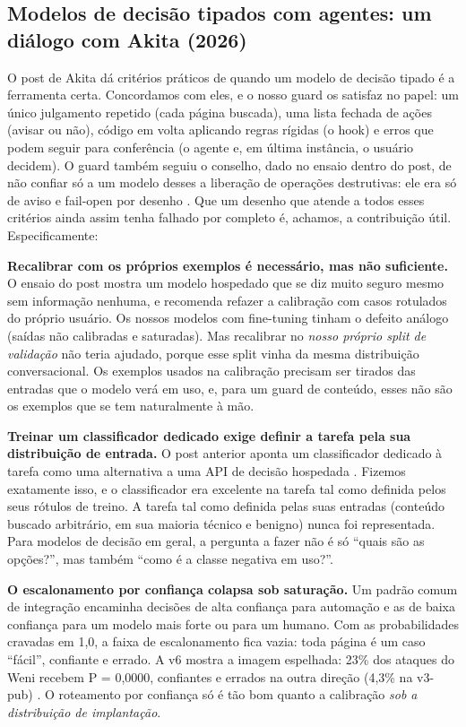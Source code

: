 \documentclass[11pt]{article}
\begin{document}
\subsection{Modelos de decisão tipados com agentes: um diálogo com Akita (2026)}\label{sec:9.2}

O post de Akita \citep{akita2026jev} dá critérios práticos de quando um modelo de decisão tipado é a ferramenta certa. Concordamos com eles, e o nosso guard os satisfaz no papel: um único julgamento repetido (cada página buscada), uma lista fechada de ações (avisar ou não), código em volta aplicando regras rígidas (o hook) e erros que podem seguir para conferência (o agente e, em última instância, o usuário decidem). O guard também seguiu o conselho, dado no ensaio dentro do post, de não confiar só a um modelo desses a liberação de operações destrutivas: ele era só de aviso e fail-open por desenho%
. Que um desenho que atende a todos esses critérios ainda assim tenha falhado por completo é, achamos, a contribuição útil. Especificamente:

\textbf{Recalibrar com os próprios exemplos é necessário, mas não suficiente.} O ensaio do post mostra um modelo hospedado que se diz muito seguro mesmo sem informação nenhuma, e recomenda refazer a calibração com casos rotulados do próprio usuário. %
Os nossos modelos com fine-tuning tinham o defeito análogo (saídas não calibradas e saturadas). Mas recalibrar no \emph{nosso próprio split de validação} não teria ajudado, porque esse split vinha da mesma distribuição conversacional. Os exemplos usados na calibração precisam ser tirados das entradas que o modelo verá em uso, e, para um guard de conteúdo, esses não são os exemplos que se tem naturalmente à mão.

\textbf{Treinar um classificador dedicado exige definir a tarefa pela sua distribuição de entrada.} O post anterior aponta um classificador dedicado à tarefa como uma alternativa a uma API de decisão hospedada \citep{akita2026typesafe}. Fizemos exatamente isso, e o classificador era excelente na tarefa tal como definida pelos seus rótulos de treino. A tarefa tal como definida pelas suas entradas (conteúdo buscado arbitrário, em sua maioria técnico e benigno) nunca foi representada. Para modelos de decisão em geral, a pergunta a fazer não é só ``quais são as opções?'', mas também ``como é a classe negativa em uso?''.

\textbf{O escalonamento por confiança colapsa sob saturação.} Um padrão comum de integração encaminha decisões de alta confiança para automação e as de baixa confiança para um modelo mais forte ou para um humano. Com as probabilidades cravadas em 1,0, a faixa de escalonamento fica vazia: toda página é um caso ``fácil'', confiante e errado. A v6 mostra a imagem espelhada: 23\% dos ataques do Weni recebem P = 0,0000, confiantes e errados na outra direção (4,3\% na v3-pub)%
. O roteamento por confiança só é tão bom quanto a calibração \emph{sob a distribuição de implantação}.
\end{document}
